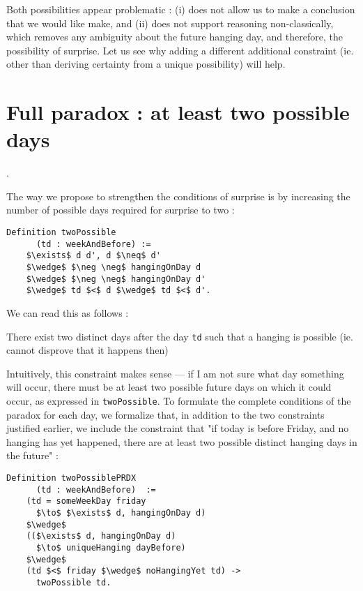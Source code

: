 \documentclass[journal]{journal}
\newenvironment{myindent}{\begin{adjustwidth}{1cm}{}}{\end{adjustwidth}}
\begin{document}
Both possibilities appear problematic : (i) does not allow us to make
a conclusion that we would like make,
and (ii) does not support reasoning non-classically, which removes any ambiguity
about the future hanging day, and therefore, the possibility of surprise.
Let us see why adding a different additional constraint (ie. other than deriving
certainty from a unique possibility) will help.

\section{Full paradox : at least two possible days}.
\label{sec:two}

The way we propose to strengthen the conditions of surprise is by increasing
the number of possible days required for surprise to two :

\begin{lstlisting}[mathescape=true]
  Definition twoPossible
      (td : weekAndBefore) :=
    $\exists$ d d', d $\neq$ d'
    $\wedge$ $\neg \neg$ hangingOnDay d
    $\wedge$ $\neg \neg$ hangingOnDay d'
    $\wedge$ td $<$ d $\wedge$ td $<$ d'.
\end{lstlisting}

We can read this as follows :

\begin{myindent}
  There exist two distinct days after the day {\tt td} such that
  a hanging is possible (ie. cannot disprove that it happens then)
\end{myindent}

Intuitively, this constraint makes sense --- if I am not sure what day something
will occur, there must be at least two possible future days on which it could occur,
as expressed in {\tt twoPossible}.
To formulate the complete conditions of the paradox for each day, we formalize that, in addition
to the two constraints justified earlier, we include the constraint that
"if today is before Friday, and no hanging has yet happened, there are at least
two possible distinct hanging days in the future" :

\begin{lstlisting}[mathescape=true]
  Definition twoPossiblePRDX
      (td : weekAndBefore)  :=
    (td = someWeekDay friday
      $\to$ $\exists$ d, hangingOnDay d)
    $\wedge$
    (($\exists$ d, hangingOnDay d)
      $\to$ uniqueHanging dayBefore)
    $\wedge$
    (td $<$ friday $\wedge$ noHangingYet td) ->
      twoPossible td.
\end{lstlisting}
\end{document}
